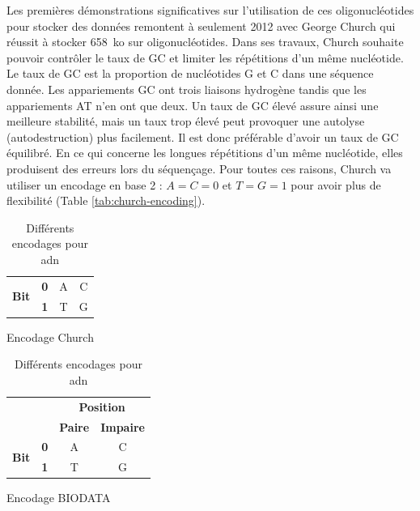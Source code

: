 \documentclass[a4paper]{report}
\begin{document}
Les premières démonstrations significatives sur l’utilisation de ces oligonucléotides pour stocker des données remontent à seulement 2012 avec George Church \cite{church2012next} qui réussit à stocker 658~ko sur  oligonucléotides.
Dans ses travaux, Church souhaite pouvoir contrôler le taux de GC et limiter les répétitions d’un même nucléotide.
Le taux de GC est la proportion de nucléotides G et C dans une séquence donnée. 
Les appariements GC ont trois liaisons hydrogène tandis que les appariements AT n'en ont que deux.
Un taux de GC élevé assure ainsi une meilleure stabilité, mais un taux trop élevé peut provoquer une autolyse (autodestruction) plus facilement.
Il est donc préférable d’avoir un taux de GC équilibré.
En ce qui concerne les longues répétitions d’un même nucléotide, elles produisent des erreurs lors du séquençage.
Pour toutes ces raisons, Church va utiliser un encodage en base 2 : $A=C=0$ et $T=G=1$ pour avoir plus de flexibilité (Table \ref{tab:church-encoding}).

\begin{table}[ht]
\centering
\setlength{\tabcolsep}{.8em}
\renewcommand\arraystretch{1.5}

\begin{subtable}[t]{.45\textwidth}
  \centering
  \begin{tabular}{|c|c|c|c|}
  \hline
  \multirow{2}{*}{\textbf{Bit}} & \textbf{0} & A & C \\
  \cline{2-4}
  & \textbf{1} & T & G \\
  \hline
  \end{tabular}
  \caption{Encodage Church}
  \label{tab:church-encoding}
\end{subtable}
\hfill
\begin{subtable}[t]{.54\textwidth}
  \centering
  \begin{tabular}{|c|c|c|c|}
  \cline{3-4}
  \multicolumn{2}{c|}{} & \multicolumn{2}{c|}{\textbf{Position}} \\
  \cline{3-4}
  \multicolumn{2}{c|}{} & \textbf{Paire} & \textbf{Impaire} \\
  \hline
  \multirow{2}{*}{\textbf{Bit}} & \textbf{0} & A & C \\
  \cline{2-4}
  & \textbf{1} & T & G \\
  \hline
  \end{tabular}
  \caption{Encodage BIODATA}
  \label{tab:biodata-encoding}
\end{subtable}

\caption{Différents encodages pour \ac{adn}}
\label{tab:dna-encodings}
\end{table}
\end{document}
